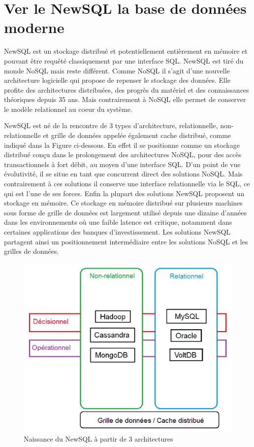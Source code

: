 \section{Ver le NewSQL la base de données moderne}
NewSQL est un stockage distribué et potentiellement entièrement en mémoire et pouvant être requêté classiquement par une interface SQL. NewSQL est tiré du monde NoSQL mais reste différent. Comme NoSQL il s’agit d’une nouvelle architecture logicielle qui propose de repenser le stockage des données. Elle profite des architectures distribuées, des progrès du matériel et des connaissances théoriques depuis 35 ans. Mais contrairement à NoSQL elle permet de conserver le modèle relationnel au coeur du système.

NewSQL est né de la rencontre de 3 types d’architecture, relationnelle, non-relationnelle et grille de données appelée également cache distribué, comme indiqué dans la Figure ci-dessous. En effet il se positionne comme un stockage distribué conçu dans le prolongement des architectures NoSQL, pour des accès transactionnels à fort débit, au moyen d’une interface SQL. D’un point de vue évolutivité, il se situe en tant que concurrent direct des solutions NoSQL. Mais contrairement à ces solutions il conserve une interface relationnelle via le SQL, ce qui est l’une de ses forces. Enfin la plupart des solutions NewSQL proposent un stockage en mémoire. Ce stockage en mémoire distribué sur plusieurs machines sous forme de grille de données est largement utilisé depuis une dizaine d’années dans les environnements où une faible latence est critique, notamment dans certaines applications des banques d’investissement. Les solutions NewSQL partagent ainsi un positionnement intermédiaire entre les solutions NoSQL et les grilles de données.

\begin{figure}[h]
	\centering
    \includegraphics[scale=0.5]{img/part1/4.13}
    \caption{Naissance du NewSQL à partir de 3 architectures}
\end{figure}
\newpage
